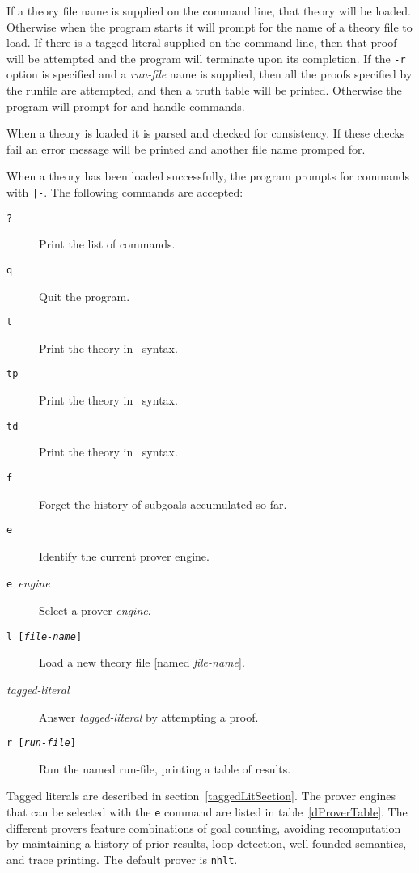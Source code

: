 \noindent If a theory file name is supplied on the
command line, that theory will be loaded. Otherwise when the
program starts it will prompt for the name of a theory file
to load. If there is a tagged literal supplied on the command
line, then that proof will be attempted and the program
will terminate upon its completion. If the {\tt -r} option
is specified and a {\it run-file} name is supplied, then
all the proofs specified by the runfile are attempted,
and then a truth table will be printed. Otherwise the
program will prompt for and handle commands.

When a theory is loaded it is parsed and checked for
consistency. If these checks fail an error message will
be printed and another file name promped for.

When a theory has been loaded successfully, the program
prompts for commands with \verb"|-". The following commands
are accepted:

\begin{description}
   \item[{\tt ?}] Print the list of commands.
   \item[{\tt q}] Quit the program.
   \item[{\tt t}] Print the theory in \deimos\ syntax.
   \item[{\tt tp}] Print the theory in \dprolog\ syntax.
   \item[{\tt td}] Print the theory in \delores\ syntax.
   \item[{\tt f}] Forget the history of subgoals
      accumulated so far.
   \item[{\tt e}] Identify the current prover engine.
   \item[{\tt e~}{\it engine}] Select a prover {\it engine}.
   \item[{\tt l~[{\it file-name}]}] Load a new theory file
     [named {\it file-name}].
   \item[{\it tagged-literal}] Answer {\it tagged-literal}
      by attempting a proof.
   \item[{\tt r~[{\it run-file}]}] Run the named run-file, 
      printing a table of results.
\end{description}

Tagged literals are described in 
section~\ref{taggedLitSection}. The prover engines that can be 
selected with the {\tt e} command are listed in 
table~\ref{dProverTable}. The different provers feature
combinations of goal counting, avoiding recomputation
by maintaining a history of prior results, loop detection,
well-founded semantics, 
and trace printing. The default prover is \verb"nhlt".

